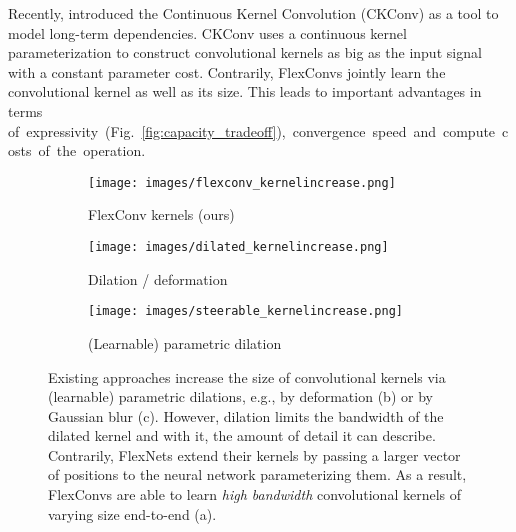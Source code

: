 \documentclass{article} \usepackage{iclr2022_conference,times}
\begin{document}
Recently, \citet{romero2021ckconv} introduced the Continuous Kernel Convolution (CKConv) as a tool to model long-term dependencies. CKConv uses a continuous kernel parameterization to construct convolutional kernels as big as the input signal with a constant parameter cost. Contrarily, FlexConvs jointly learn the convolutional kernel as well as its size. This leads to important advantages in terms of~expressivity~(Fig.~\ref{fig:capacity_tradeoff}),~convergence~speed~and~compute~costs~of~the~operation.
\begin{figure}
\vspace{-2mm}
    \centering
     \begin{subfigure}[c]{0.28\textwidth}
         \centering
         \vspace{-4mm}
         \texttt{[image: images/flexconv\_kernelincrease.png]}
         \caption{FlexConv kernels (ours)}
         \label{fig:flexconv_kernel}
     \end{subfigure}
     \hfill
     \begin{subfigure}[c]{0.28\textwidth}
         \centering
         \texttt{[image: images/dilated\_kernelincrease.png]}
         \caption{Dilation / deformation\newline \citep{dai2017deformable}}
         \label{fig:dilated_kernel}
     \end{subfigure}
     \hfill
      \begin{subfigure}[c]{0.36\textwidth}
     \centering
     \texttt{[image: images/steerable\_kernelincrease.png]}
     \caption{(Learnable) parametric dilation\newline \citep{pintea2021resolution}}
     \label{fig:parametric_dilation}
     \end{subfigure}
    \vspace{-2.5mm}
    \caption{Existing approaches increase the size of convolutional kernels via (learnable) parametric dilations, e.g., by deformation (b) or by Gaussian blur (c). However, dilation limits the bandwidth of the dilated kernel and with it, the amount of detail it can describe. Contrarily, FlexNets extend their kernels by passing a larger vector of positions to the neural network parameterizing them. As a result, FlexConvs are able to learn \textit{high bandwidth} convolutional kernels of varying size end-to-end (a).
    \vspace{-3.5mm}}
    \label{fig:dilations}
\end{figure}
\end{document}
